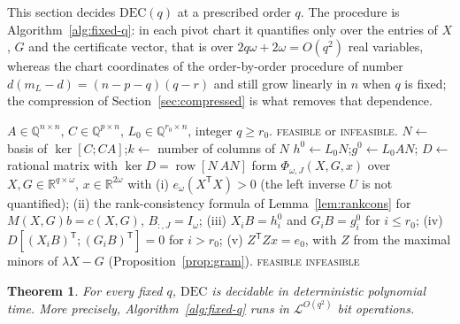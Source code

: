 \documentclass[journal]{IEEEtran}
\theoremstyle{plainn}
\newtheorem{thm}{Theorem}
\theoremstyle{remark}
\begin{document}
This section decides $\mathrm{DEC}(q)$ at a prescribed order $q$. The procedure
is Algorithm~\ref{alg:fixed-q}: in each pivot chart it quantifies only over the
entries of $X$, $G$ and the certificate vector, that is over
$2q\omega+2\omega=O(q^2)$ real variables, whereas the chart coordinates of the
order-by-order procedure of \cite{fer26b} number $d(m_L-d)=(n-p-q)(q-r)$ and
still grow linearly in $n$ when $q$ is fixed; the compression of
Section~\ref{sec:compressed} is what removes that dependence.

\begin{algorithm}[!t]
\caption{Deciding $\mathrm{DEC}(q)$ for a fixed order $q$}
\label{alg:fixed-q}
\begin{algorithmic}[1]
\Require $A\in\mathbb Q^{n\times n}$, $C\in\mathbb Q^{p\times n}$,
$L_0\in\mathbb Q^{r_0\times n}$, integer $q\ge r_0$.
\Ensure \textsc{feasible} or \textsc{infeasible}.
\State $N\gets$ basis of $\ker[C;CA]$;\quad $k\gets$ number of columns of $N$
\State $h^0\gets L_0N$;\quad $g^0\gets L_0AN$;\quad
$D\gets$ rational matrix with $\ker D=\operatorname{row}[N\ AN]$
    \State form $\Phi_{\omega,J}(X,G,x)$ over $X,G\in\mathbb R^{q\times\omega}$,
           $x\in\mathbb R^{2\omega}$ with
    \Statex \quad (i) $e_\omega(X^{\mathsf T}X)>0$ (the left inverse $U$ is
           not quantified);
    \Statex \quad (ii) the rank-consistency formula of
           Lemma~\ref{lem:rankcons} for $M(X,G)b=c(X,G)$, $B_{:,J}=I_\omega$;
    \Statex \quad (iii) $X_iB=h_i^0$ and $G_iB=g_i^0$ for $i\le r_0$;
    \Statex \quad (iv) $D[(X_iB)^{\mathsf T};(G_iB)^{\mathsf T}]=0$ for
           $i>r_0$;
    \Statex \quad (v) $Z^{\mathsf T}Zx=e_0$, with $Z$ from the maximal minors
           of $\lambda X-G$ (Proposition~\ref{prop:gram}).
      \State \Return \textsc{feasible}
    \EndIf
  \EndFor
\EndFor
\State \Return \textsc{infeasible}
\end{algorithmic}
\end{algorithm}

\begin{thm}\label{thm:fixedq}
For every fixed $q$, $\mathrm{DEC}$ is decidable in deterministic polynomial
time. More precisely, Algorithm~\ref{alg:fixed-q} runs in
$\mathcal L^{O(q^2)}$ bit operations.
\end{thm}
\end{document}
